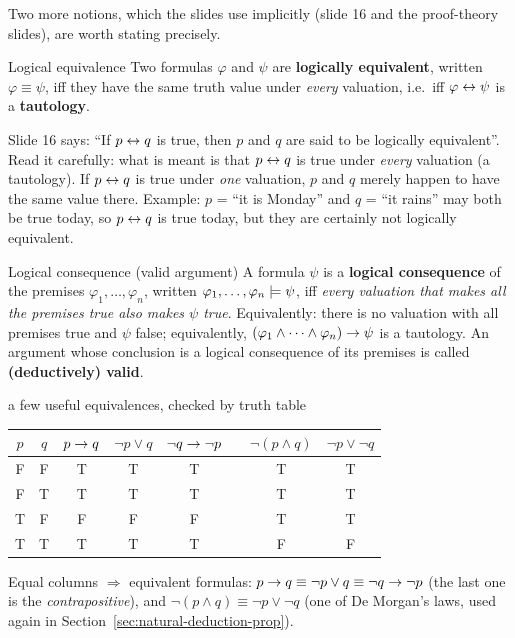 Two more notions, which the slides use implicitly (slide 16 and the proof-theory slides),
are worth stating precisely.

\begin{nbdef}{Logical equivalence}
Two formulas $\varphi$ and $\psi$ are \textbf{logically equivalent}, written
$\varphi \equiv \psi$, iff they have the same truth value under \emph{every} valuation,
i.e.\ iff $\varphi \leftrightarrow \psi$ is a \textbf{tautology}.
\end{nbdef}

\begin{nbwarning}
Slide 16 says: ``If $p \leftrightarrow q$ is true, then $p$ and $q$ are said to be logically
equivalent''. Read it carefully: what is meant is that $p \leftrightarrow q$ is true under
\emph{every} valuation (a tautology). If $p \leftrightarrow q$ is true under \emph{one} valuation,
$p$ and $q$ merely happen to have the same value there. Example: $p$ = ``it is Monday'' and
$q$ = ``it rains'' may both be true today, so $p \leftrightarrow q$ is true today, but they are
certainly not logically equivalent.
\end{nbwarning}

\begin{nbdef}{Logical consequence (valid argument)}
A formula $\psi$ is a \textbf{logical consequence} of the premises
$\varphi_1, \ldots, \varphi_n$, written $\varphi_1, \ldots, \varphi_n \models \psi$, iff
\emph{every valuation that makes all the premises true also makes $\psi$ true}. Equivalently:
there is no valuation with all premises true and $\psi$ false; equivalently,
$(\varphi_1 \land \cdots \land \varphi_n) \rightarrow \psi$ is a tautology. An argument whose
conclusion is a logical consequence of its premises is called \textbf{(deductively)
valid}.
\end{nbdef}

\begin{nbexample}{a few useful equivalences, checked by truth table}
\begin{center}
\renewcommand{\arraystretch}{1.1}
\begin{tabular}{cc|cc|cc|cc}
$p$ & $q$ & $p \rightarrow q$ & $\neg p \lor q$ & $\neg q \rightarrow \neg p$ & & $\neg(p \land q)$ & $\neg p \lor \neg q$ \\
\hline
F & F & T & T & T & & T & T \\
F & T & T & T & T & & T & T \\
T & F & F & F & F & & T & T \\
T & T & T & T & T & & F & F \\
\end{tabular}
\end{center}
Equal columns $\Rightarrow$ equivalent formulas:
$p \rightarrow q \equiv \neg p \lor q \equiv \neg q \rightarrow \neg p$ (the last one is the
\emph{contrapositive}), and $\neg(p \land q) \equiv \neg p \lor \neg q$ (one of De Morgan's
laws, used again in Section~\ref{sec:natural-deduction-prop}).
\end{nbexample}

